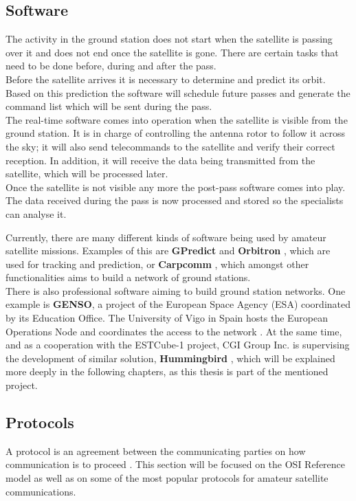 \subsection{Software}
The activity in the ground station does not start when the satellite is passing over it and does not end once the satellite is gone. There are certain tasks that need to be done before, during and after the pass.\\

Before the satellite arrives it is necessary to determine and predict its orbit. Based on this prediction the software will schedule future passes and generate the command list which will be sent during the pass.\\

The real-time software comes into operation when the satellite is visible from the ground station. It is in charge of controlling the antenna rotor to follow it across the sky; it will also send telecommands to the satellite and verify their correct reception. In addition, it will receive the data being transmitted from the satellite, which will be processed later.\\

Once the satellite is not visible any more the post-pass software comes into play. The data received during the pass is now processed and stored so the specialists can analyse it.


Currently, there are many different kinds of software being used by amateur satellite missions. Examples of this are \textbf{GPredict} \cite{GPredict} and \textbf{Orbitron} \cite{Orbitron}, which are used for tracking and prediction, or \textbf{Carpcomm} \cite{Carpcomm}, which amongst other functionalities aims to build a network of ground stations.\\

There is also professional software aiming to build ground station networks. One example is \textbf{GENSO}, a project of the European Space Agency (ESA) coordinated by its Education Office. The University of Vigo in Spain hosts the European Operations Node and coordinates the access to the network \cite{GENSO}. At the same time, and as a cooperation with the ESTCube-1 project, CGI Group Inc. is supervising the development of similar solution, \textbf{Hummingbird} \cite{CGI}, which will be explained more deeply in the following chapters, as this thesis is part of the mentioned project.


\subsection{Protocols}
A protocol is an agreement between the communicating parties on how communication is to proceed \cite{Tanenbaum}. This section will be focused on the OSI Reference model as well as on some of the most popular protocols for amateur satellite communications.

